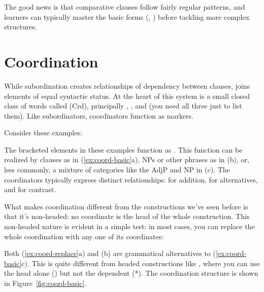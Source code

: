 The good news is that comparative clauses follow fairly regular patterns, and learners can typically master the basic forms (, ) before tackling more complex structures.

\section{Coordination}\label{sec:coordination}

While subordination creates relationships of dependency between clauses,  joins elements of equal syntactic status. At the heart of this system is a small closed class of words called  (Crd), principally , , and  (you need all three just to list them). Like subordinators, coordinators function as markers.

Consider these examples:

\ea \label{ex:coord-basic}
    \z
\z
The bracketed elements in these examples function as . This function can be realized by clauses as in (\ref{ex:coord-basic}a), NPs or other phrases as in (b), or, less commonly, a mixture of categories like the AdjP and NP in (c). The coordinators typically express distinct relationships:  for addition,  for alternatives, and  for contrast.

What makes coordination different from the constructions we've seen before is that it's non-headed: no coordinate is the head of the whole construction. This non-headed nature is evident in a simple test: in most cases, you can replace the whole coordination with any one of its coordinates:

\ea \label{ex:coord-replace}
    \z
\z
Both (\ref{ex:coord-replace}a) and (b) are grammatical alternatives to (\ref{ex:coord-basic}c). This is quite different from headed constructions like , where you can use the head alone () but not the dependent (*). The coordination structure is shown in Figure~\ref{fig:coord-basic}.

